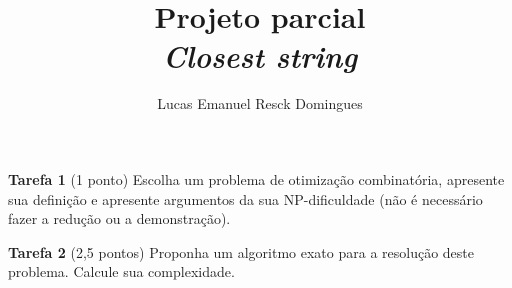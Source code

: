 \documentclass{article}
\title{Projeto parcial \\
\large \textit{Closest string}}
\author{Lucas Emanuel Resck Domingues}
\begin{document}
    \maketitle
    
    \noindent \textbf{Tarefa 1} (1 ponto) Escolha um problema de otimização combinatória, apresente sua definição e apresente argumentos da sua NP-dificuldade (não é necessário fazer a redução ou a demonstração).

    \bigskip

    

    \newpage
    
    \noindent \textbf{Tarefa 2} (2,5 pontos) Proponha um algoritmo exato para a resolução deste     problema. Calcule sua complexidade.

    \bigskip

    

    \newpage

    
    
\end{document}
